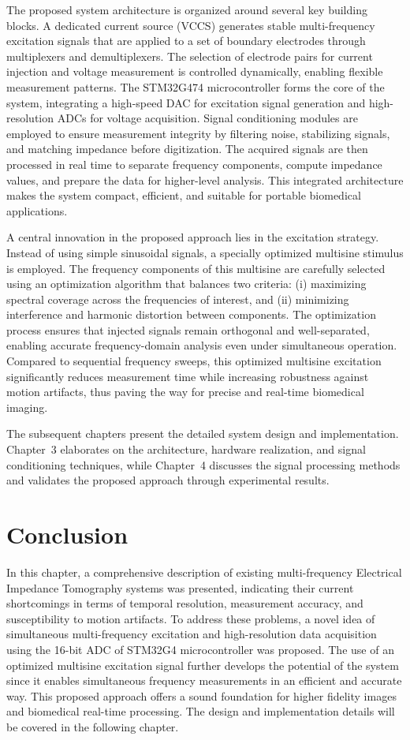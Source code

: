The proposed system architecture is organized around several key building blocks. A dedicated current source (VCCS) generates stable multi-frequency excitation signals that are applied to a set of boundary electrodes through multiplexers and demultiplexers. The selection of electrode pairs for current injection and voltage measurement is controlled dynamically, enabling flexible measurement patterns. The STM32G474 microcontroller forms the core of the system, integrating a high-speed DAC for excitation signal generation and high-resolution ADCs for voltage acquisition. Signal conditioning modules are employed to ensure measurement integrity by filtering noise, stabilizing signals, and matching impedance before digitization. The acquired signals are then processed in real time to separate frequency components, compute impedance values, and prepare the data for higher-level analysis. This integrated architecture makes the system compact, efficient, and suitable for portable biomedical applications.  


A central innovation in the proposed approach lies in the excitation strategy. Instead of using simple sinusoidal signals, a specially optimized multisine stimulus is employed. The frequency components of this multisine are carefully selected using an optimization algorithm that balances two criteria: (i) maximizing spectral coverage across the frequencies of interest, and (ii) minimizing interference and harmonic distortion between components. The optimization process ensures that injected signals remain orthogonal and well-separated, enabling accurate frequency-domain analysis even under simultaneous operation. Compared to sequential frequency sweeps, this optimized multisine excitation significantly reduces measurement time while increasing robustness against motion artifacts, thus paving the way for precise and real-time biomedical imaging.  

The subsequent chapters present the detailed system design and implementation. Chapter~3 elaborates on the architecture, hardware realization, and signal conditioning techniques, while Chapter~4 discusses the signal processing methods and validates the proposed approach through experimental results.

\section{Conclusion}

In this chapter, a comprehensive description of existing multi-frequency Electrical Impedance Tomography systems was presented, indicating their current shortcomings in terms of temporal resolution, measurement accuracy, and susceptibility to motion artifacts. To address these problems, a novel idea of simultaneous multi-frequency excitation and high-resolution data acquisition using the 16-bit ADC of STM32G4 microcontroller was proposed. The use of an optimized multisine excitation signal further develops the potential of the system since it enables simultaneous frequency measurements in an efficient and accurate way.
This proposed approach offers a sound foundation for higher fidelity images and
biomedical real-time processing. The design and implementation details will be covered
in the following chapter.

